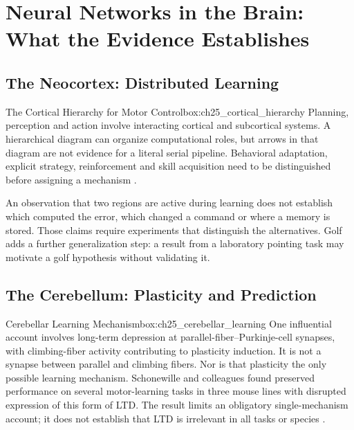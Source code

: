 \section{Neural Networks in the Brain: What the Evidence Establishes}
\label{sec:ch25_neural_networks}

\subsection{The Neocortex: Distributed Learning}
\label{subsec:ch25_neocortex}

\begin{principle}{The Cortical Hierarchy for Motor Control}{box:ch25_cortical_hierarchy}
Planning, perception and action involve interacting cortical and subcortical systems. A hierarchical diagram can organize computational roles, but arrows in that diagram are not evidence for a literal serial pipeline. Behavioral adaptation, explicit strategy, reinforcement and skill acquisition need to be distinguished before assigning a mechanism \citep{kitago2013motor}.
\end{principle}

An observation that two regions are active during learning does not establish which computed the error, which changed a command or where a memory is stored. Those claims require experiments that distinguish the alternatives. Golf adds a further generalization step: a result from a laboratory pointing task may motivate a golf hypothesis without validating it.

\subsection{The Cerebellum: Plasticity and Prediction}
\label{subsec:ch25_cerebellum_learning}

\begin{principle}{Cerebellar Learning Mechanism}{box:ch25_cerebellar_learning}
One influential account involves long-term depression at parallel-fiber--Purkinje-cell synapses, with climbing-fiber activity contributing to plasticity induction. It is not a synapse between parallel and climbing fibers. Nor is that plasticity the only possible learning mechanism. Schonewille and colleagues found preserved performance on several motor-learning tasks in three mouse lines with disrupted expression of this form of LTD. The result limits an obligatory single-mechanism account; it does not establish that LTD is irrelevant in all tasks or species \citep{schonewille2011ltd}.
\end{principle}

